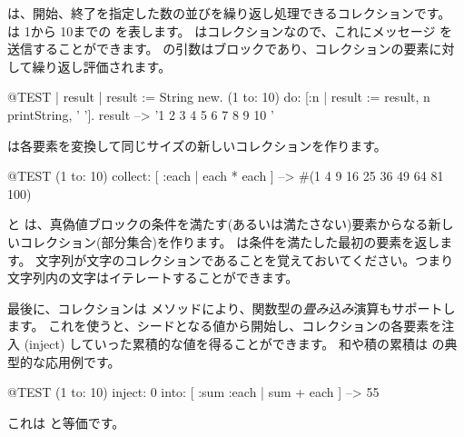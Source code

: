 \documentclass[a4paper,10pt,twoside]{book}
\begin{document}
 は、開始、終了を指定した数の並びを繰り返し処理できるコレクションです。
は 1から 10までの  を表します。
 はコレクションなので、これにメッセージ  を送信することができます。
 の引数はブロックであり、コレクションの要素に対して繰り返し評価されます。

\begin{code}{@TEST | result |}
result := String new.
(1 to: 10) do: [:n | result := result, n printString, ' '].
result --> '1 2 3 4 5 6 7 8 9 10 '
\end{code}


 は各要素を変換して同じサイズの新しいコレクションを作ります。
\begin{code}{@TEST}
(1 to: 10) collect: [ :each | each * each ] --> #(1 4 9 16 25 36 49 64 81 100)
\end{code}

 と  は、真偽値ブロックの条件を満たす(あるいは満たさない)要素からなる新しいコレクション(部分集合)を作ります。
 は条件を満たした最初の要素を返します。
文字列が文字のコレクションであることを覚えておいてください。つまり文字列内の文字はイテレートすることができます。


最後に、コレクションは  メソッドにより、関数型の\emph{畳み込み}演算もサポートします。
これを使うと、シードとなる値から開始し、コレクションの各要素を注入 (inject) していった累積的な値を得ることができます。
和や積の累積は  の典型的な応用例です。

\begin{code}{@TEST}
(1 to: 10) inject: 0 into: [ :sum :each | sum + each ] --> 55
\end{code}

\noindent
これは と等価です。
\end{document}
